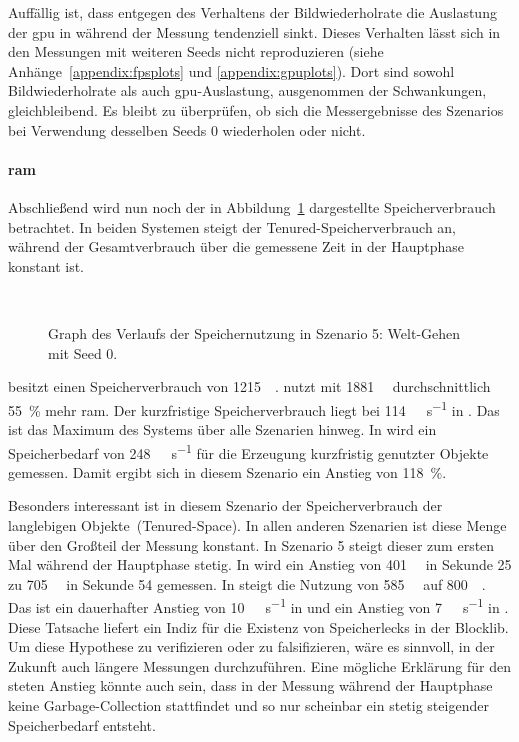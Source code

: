 Auffällig ist, dass entgegen des Verhaltens der Bildwiederholrate die Auslastung der \ac{gpu} in \sysB{} während der Messung tendenziell sinkt. Dieses Verhalten lässt sich in den Messungen mit weiteren Seeds nicht reproduzieren (siehe Anhänge~\vref{appendix:fpsplots} und \vref{appendix:gpuplots}). Dort sind sowohl Bildwiederholrate als auch \ac{gpu}-Auslastung, ausgenommen der Schwankungen, gleichbleibend. Es bleibt zu überprüfen, ob sich die Messergebnisse des Szenarios bei Verwendung desselben Seeds $0$ wiederholen oder nicht.

\paragraph{\ac{ram}}
Abschließend wird nun noch der in Abbildung~\ref{fig:seed-0-walk-mem} dargestellte Speicherverbrauch betrachtet. In beiden Systemen steigt der Tenured-Speicherverbrauch an, während der Gesamtverbrauch über die gemessene Zeit in der Hauptphase konstant ist.
\begin{figure}[!htbp]
	\\
	\caption{Graph des Verlaufs der Speichernutzung in Szenario 5: Welt-Gehen mit Seed 0.}\label{fig:seed-0-walk-mem}
\end{figure} 
\sysA{} besitzt einen Speicherverbrauch von \SI{1215}{\mega\byte}. \sysB{} nutzt mit \SI{1881}{\mega\byte} durchschnittlich \SI{55}{\percent} mehr \ac{ram}. Der kurzfristige Speicherverbrauch liegt bei \SI{114}{\mega\byte\per\second} in \sysA{}. Das ist das Maximum des Systems über alle Szenarien hinweg. In \sysB{} wird ein Speicherbedarf von \SI{248}{\mega\byte\per\second} für die Erzeugung kurzfristig genutzter Objekte gemessen. Damit ergibt sich in diesem Szenario ein Anstieg von \SI{118}{\percent}. 

Besonders interessant ist in diesem Szenario der Speicherverbrauch der langlebigen Objekte~(Tenured-Space). In allen anderen Szenarien ist diese Menge über den Großteil der Messung konstant.
In Szenario 5 steigt dieser zum ersten Mal während der Hauptphase stetig. In \sysA{} wird ein Anstieg von \SI{401}{\mega\byte} in Sekunde 25 zu \SI{705}{\mega\byte} in Sekunde 54 gemessen. In \sysB{} steigt die Nutzung von \SI{585}{\mega\byte} auf \SI{800}{\mega\byte}. Das ist ein dauerhafter Anstieg von \SI{10}{\mega\byte\per\second} in \sysA{} und ein Anstieg von \SI{7}{\mega\byte\per\second} in \sysB{}. Diese Tatsache liefert ein Indiz für die Existenz von Speicherlecks in der Blocklib. Um diese Hypothese zu verifizieren oder zu falsifizieren, wäre es sinnvoll, in der Zukunft auch längere Messungen durchzuführen. Eine mögliche Erklärung für den steten Anstieg könnte auch sein, dass in der Messung während der Hauptphase keine Garbage-Collection stattfindet und so nur scheinbar ein stetig steigender Speicherbedarf entsteht.

